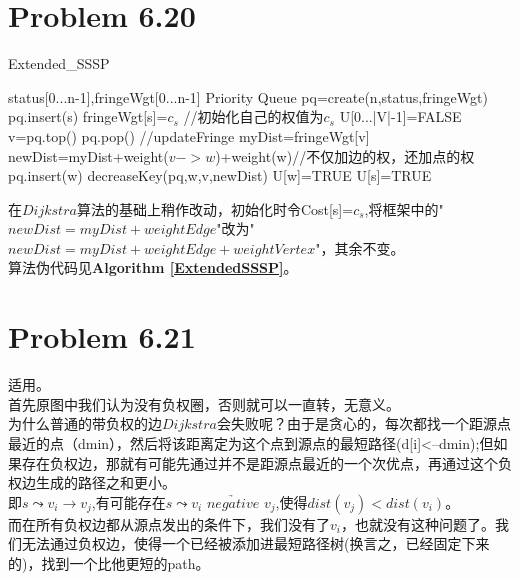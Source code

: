 \documentclass[twocolumn]{ctexart}
\begin{document}
\section*{Problem 6.20}
\begin{algorithm}[htbp]
	\caption{Extended\_SSSP}
	\label{ExtendedSSSP}
	\begin{algorithmic}[1]
		\STATE status[0...n-1],fringeWgt[0...n-1]
		\STATE Priority Queue pq=create(n,status,fringeWgt)
		\STATE pq.insert(s)
		\STATE fringeWgt[s]=$c_s$ //初始化自己的权值为$c_s$
		\STATE U[0...|V|-1]=FALSE
		\STATE v=pq.top()
		\STATE pq.pop()
		\STATE //updateFringe
		\STATE myDist=fringeWgt[v]
		\STATE newDist=myDist+weight($v->w$)+weight(w)//不仅加边的权，还加点的权
		\STATE pq.insert(w)
		\STATE decreaseKey(pq,w,v,newDist)
		\ENDIF
		\ELSE	
		\STATE U[w]=TRUE
		\ENDIF
		\ENDIF
		\ENDFOR
		\ENDWHILE
		U[s]=TRUE
	\end{algorithmic}
\end{algorithm}

\indent 在$Dijkstra$算法的基础上稍作改动，初始化时令Cost[s]=$c_s$,将框架中的"$newDist = myDist+weightEdge$"改为"$newDist = myDist+weightEdge+weightVertex$"，其余不变。\\
\indent 
算法伪代码见\textbf{Algorithm \ref{ExtendedSSSP}}。\\


\section*{Problem 6.21}
\indent 适用。\\
\indent 首先原图中我们认为没有负权圈，否则就可以一直转，无意义。\\
\indent 为什么普通的带负权的边$Dijkstra$会失败呢？由于是贪心的，每次都找一个距源点最近的点（dmin），然后将该距离定为这个点到源点的最短路径(d[i]<--dmin);但如果存在负权边，那就有可能先通过并不是距源点最近的一个次优点，再通过这个负权边生成的路径之和更小。\\
\indent 即$s\leadsto v_i \to v_j$,有可能存在$s\leadsto v_i$ $\underrightarrow{negative}$  $ v_j$,使得$dist(v_j)<dist(v_i)$。\\
\indent 而在所有负权边都从源点发出的条件下，我们没有了$v_i$，也就没有这种问题了。我们无法通过负权边，使得一个已经被添加进最短路径树(换言之，已经固定下来的)，找到一个比他更短的path。
\end{document}
